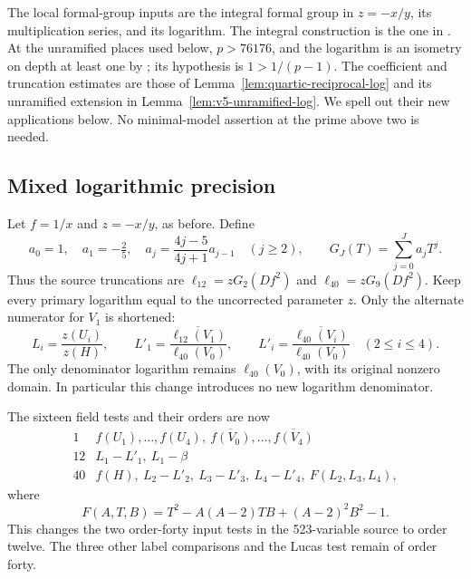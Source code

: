 The local formal-group inputs are the integral formal group in
$z=-x/y$, its multiplication series, and its logarithm.  The integral
construction is the one in \cite[IV\S1, Example~IV.2.2.3 and
Proposition~IV.2.3(a)]{silverman}.  At the unramified places used below,
$p>76176$, and the logarithm is an isometry on depth at least one by
\cite[Theorem IV.6.4, p.~132]{silverman}; its hypothesis is
$1>1/(p-1)$.  The coefficient and truncation estimates are those of
Lemma~\ref{lem:quartic-reciprocal-log} and its unramified extension in
Lemma~\ref{lem:v5-unramified-log}.  We spell out their new applications
below.  No minimal-model assertion at the prime above two is needed.

\subsection{Mixed logarithmic precision}\label{subsec:v12-mixed}

Let $f=1/x$ and $z=-x/y$, as before.  Define
\[
 a_0=1,\quad a_1=-\tfrac25,\quad
 a_j=\frac{4j-5}{4j+1}a_{j-1}\quad(j\ge2),\qquad
 G_J(T)=\sum_{j=0}^J a_jT^j.
\]
Thus the source truncations are
$\ell_{12}=zG_2(Df^2)$ and $\ell_{40}=zG_9(Df^2)$.
Keep every primary logarithm equal to the uncorrected parameter $z$.
Only the alternate numerator for $V_1$ is shortened:
\begin{equation}\label{eq:v12-ratios}
 L_i=\frac{z(U_i)}{z(H)},\qquad
 L'_1=\overline{\frac{\ell_{12}(V_1)}{\ell_{40}(V_0)}},\qquad
 L'_i=\overline{\frac{\ell_{40}(V_i)}{\ell_{40}(V_0)}}\quad(2\le i\le4).
\end{equation}
The only denominator logarithm remains $\ell_{40}(V_0)$, with its
original nonzero domain.  In particular this change introduces no
new logarithm denominator.

The sixteen field tests and their orders are now
\begin{equation}\label{eq:v12-tests}
\begin{array}{c|l}
1&f(U_1),\ldots,f(U_4),\ \overline{f(V_0)},\ldots,\overline{f(V_4)}\\[2pt]
12&L_1-L'_1,\ L_1-\beta\\[2pt]
40&f(H),\ L_2-L'_2,\ L_3-L'_3,\ L_4-L'_4,\ F(L_2,L_3,L_4),
\end{array}
\end{equation}
where
\[
 F(A,T,B)=T^2-A(A-2)TB+(A-2)^2B^2-1.
\]
This changes the two order-forty input tests in the 523-variable
source to order twelve.  The three other label comparisons and the
Lucas test remain of order forty.

